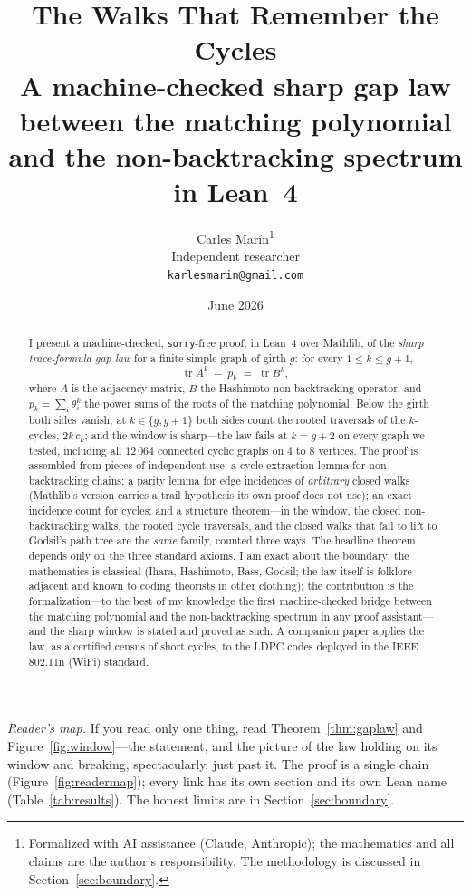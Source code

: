\documentclass[11pt]{article}
\title{\bf The Walks That Remember the Cycles\\[4pt]
  \large\normalfont A machine-checked sharp gap law between the matching polynomial\\
  and the non-backtracking spectrum in Lean~4}
\author{Carles Mar\'in\thanks{Formalized with AI assistance (Claude, Anthropic); the mathematics
and all claims are the author's responsibility. The methodology is discussed in
Section~\ref{sec:boundary}.}\\[3pt]
  \normalsize Independent researcher\\
  \normalsize \texttt{karlesmarin@gmail.com}}
\date{June 2026}
\newcommand{\lean}[1]{\texttt{#1}}
\DeclareMathOperator{\tr}{tr}
\begin{document}
\maketitle

\begin{abstract}
I present a machine-checked, \lean{sorry}-free proof, in Lean~4 over Mathlib, of the
\emph{sharp trace-formula gap law} for a finite simple graph of girth $g$: for every
$1 \le k \le g+1$,
\[
\tr A^k \;-\; p_k \;=\; \tr B^k,
\]
where $A$ is the adjacency matrix, $B$ the Hashimoto non-backtracking operator, and
$p_k = \sum_i \theta_i^k$ the power sums of the roots of the matching polynomial. Below the
girth both sides vanish; at $k \in \{g, g+1\}$ both sides count the rooted traversals of the
$k$-cycles, $2k\,c_k$; and the window is sharp---the law fails at $k = g+2$ on every
graph we tested, including all $12\,064$ connected cyclic graphs on $4$ to $8$ vertices.
The proof is assembled from pieces of independent use: a cycle-extraction lemma for
non-backtracking chains; a parity lemma for edge incidences of \emph{arbitrary} closed walks
(Mathlib's version carries a trail hypothesis its own proof does not use); an exact
incidence count for cycles; and a structure theorem---in the window, the closed
non-backtracking walks, the rooted cycle traversals, and the closed walks that fail to lift
to Godsil's path tree are the \emph{same} family, counted three ways. The headline theorem
depends only on the three standard axioms. I am exact about the boundary: the mathematics is
classical (Ihara, Hashimoto, Bass, Godsil; the law itself is folklore-adjacent and known to
coding theorists in other clothing); the contribution is the formalization---to the best of
my knowledge the first machine-checked bridge between the matching polynomial and the
non-backtracking spectrum in any proof assistant---and the sharp window is stated and proved
as such. A companion paper applies the law, as a certified census of short cycles, to the
LDPC codes deployed in the IEEE 802.11n (WiFi) standard.
\end{abstract}

\noindent\emph{Reader's map.} If you read only one thing, read Theorem~\ref{thm:gaplaw} and
Figure~\ref{fig:window}---the statement, and the picture of the law holding on its window and
breaking, spectacularly, just past it. The proof is a single chain (Figure~\ref{fig:readermap});
every link has its own section and its own Lean name (Table~\ref{tab:results}). The honest
limits are in Section~\ref{sec:boundary}.
\end{document}
